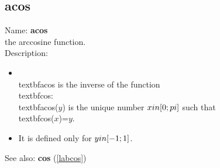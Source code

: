 \subsection{acos}
\label{labacos}
\noindent Name: \textbf{acos}\\
the arccosine function.\\
\noindent Description: \begin{itemize}

\item \\textbf{acos} is the inverse of the function \\textbf{cos}: \\textbf{acos}($y$) is the unique number \n   $x \\in [0; \\pi]$ such that \\textbf{cos}($x$)=$y$.\n
\item It is defined only for $y \\in [-1;1]$.\n\end{itemize}
See also: \textbf{cos} (\ref{labcos})
